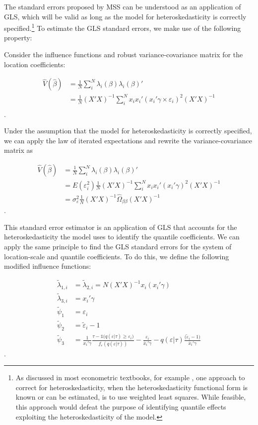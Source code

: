 \documentclass[
  authoryear,
  review,
  1p]{elsarticle}
\begin{document}
The standard errors proposed by MSS can be understood as an application
of GLS, which will be valid as long as the
model for heteroskedasticity is correctly specified.\footnote{As
  discussed in most econometric textbooks, for example \citet{cameron2005}, one
  approach to correct for heteroskedasticity, when the
  heteroskedasticity functional form is known or can be estimated, is
  to use weighted least squares. While feasible, this approach
  would defeat the purpose of identifying quantile effects exploiting
  the heteroskedasticity of the model.} To estimate the GLS standard
errors, we make use of the following property:

Consider the influence functions and robust variance-covariance matrix
for the location coefficients:

\[\begin{aligned}
\hat V(\hat \beta) &= \frac{1}{N} \sum_i^N \lambda_{i}(\beta) \lambda_{i}(\beta)' \\
&= \frac{1}{N}  (X'X)^{-1}  \sum_i^N x_i x_i' ( x_i'\gamma \times \varepsilon_i)^2 (X'X)^{-1} \\
\end{aligned}
\].

Under the assumption that the model for heteroskedasticity is correctly
specified, we can apply the law of iterated expectations and rewrite the
variance-covariance matrix as

\[\begin{aligned}
\hat V(\hat \beta) &= \frac{1}{N} \sum_i^N \lambda_{i}(\beta) \lambda_{i}(\beta)' \\
&= E(\varepsilon_i^2) \frac{1}{N}  (X'X)^{-1}  \sum_i^N x_i x_i' ( x_i'\gamma)^2 (X'X)^{-1} \\
&= \sigma^2_{\varepsilon} \frac{1}{N}  (X'X)^{-1}  \hat\Omega_{\beta\beta} (X'X)^{-1}  
\end{aligned}
\].

This standard error estimator is an application of GLS that accounts for
the heteroskedasticity the model uses to identify the quantile
coefficients. We can apply the same principle to find the GLS standard
errors for the system of location-scale and quantile coefficients. To do
this, we define the following modified influence functions:

\[\begin{aligned}
\tilde \lambda_{1,i}&=\tilde \lambda_{2,i}=N (X'X)^{-1}  x_i ( x_i'\gamma) \\  
\tilde \lambda_{3,i}&=x_i' \gamma  \\
\tilde \psi_1 &= \varepsilon_i \\
\tilde \psi_2 &= \tilde \varepsilon_i -1 \\
\tilde \psi_3 &= \frac{1}{ x_i' \gamma }\frac{\tau-\mathbb{1}\big( q(\varepsilon|\tau)  \geq \varepsilon_i  \big) }{ f_{\varepsilon}(q(\varepsilon|\tau))} - \frac{\varepsilon_i }{\bar x_i'\gamma} 
-  q(\varepsilon|\tau) \frac{(\tilde \varepsilon_i -1\big)}{\bar x_i'\gamma}
\end{aligned}
\].
\end{document}
